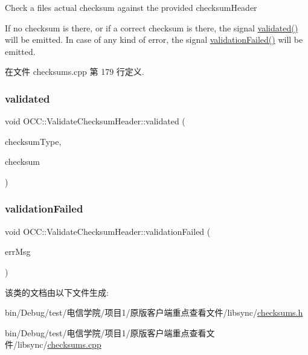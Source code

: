 Check a file\textquotesingle{}s actual checksum against the provided checksum\+Header

If no checksum is there, or if a correct checksum is there, the signal \hyperlink{class_o_c_c_1_1_validate_checksum_header_a94b124915bc14e309142b7ebb15a292d}{validated()} will be emitted. In case of any kind of error, the signal \hyperlink{class_o_c_c_1_1_validate_checksum_header_a5de3509bf48fabd8f5c2ee130b13b7d7}{validation\+Failed()} will be emitted. 

在文件 checksums.\+cpp 第 179 行定义.

\mbox{\label{class_o_c_c_1_1_validate_checksum_header_a94b124915bc14e309142b7ebb15a292d}} 
\subsubsection{\texorpdfstring{validated}{validated}}
{\footnotesize\ttfamily void O\+C\+C\+::\+Validate\+Checksum\+Header\+::validated (\begin{DoxyParamCaption}\item[{const Q\+Byte\+Array \&}]{checksum\+Type,  }\item[{const Q\+Byte\+Array \&}]{checksum }\end{DoxyParamCaption})\hspace{0.3cm}{\ttfamily [signal]}}

\mbox{\label{class_o_c_c_1_1_validate_checksum_header_a5de3509bf48fabd8f5c2ee130b13b7d7}} 
\subsubsection{\texorpdfstring{validation\+Failed}{validationFailed}}
{\footnotesize\ttfamily void O\+C\+C\+::\+Validate\+Checksum\+Header\+::validation\+Failed (\begin{DoxyParamCaption}\item[{const Q\+String \&}]{err\+Msg }\end{DoxyParamCaption})\hspace{0.3cm}{\ttfamily [signal]}}



该类的文档由以下文件生成\+:\begin{DoxyCompactItemize}
\item 
bin/\+Debug/test/电信学院/项目1/原版客户端重点查看文件/libsync/\hyperlink{checksums_8h}{checksums.\+h}\item 
bin/\+Debug/test/电信学院/项目1/原版客户端重点查看文件/libsync/\hyperlink{checksums_8cpp}{checksums.\+cpp}\end{DoxyCompactItemize}
